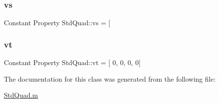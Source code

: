 \subsubsection{\texorpdfstring{vs}{vs}}
{\footnotesize\ttfamily Constant Property Std\+Quad\+::vs = \mbox{[}}

\mbox{\label{class_std_quad_ae1a39038e05ac243fa152fd0da69446a}} 
\subsubsection{\texorpdfstring{vt}{vt}}
{\footnotesize\ttfamily Constant Property Std\+Quad\+::vt = \mbox{[} 0, 0, 0, 0\mbox{]}\textquotesingle{}}



The documentation for this class was generated from the following file\+:\begin{DoxyCompactItemize}
\item 
\hyperlink{_std_quad_8m}{Std\+Quad.\+m}\end{DoxyCompactItemize}
